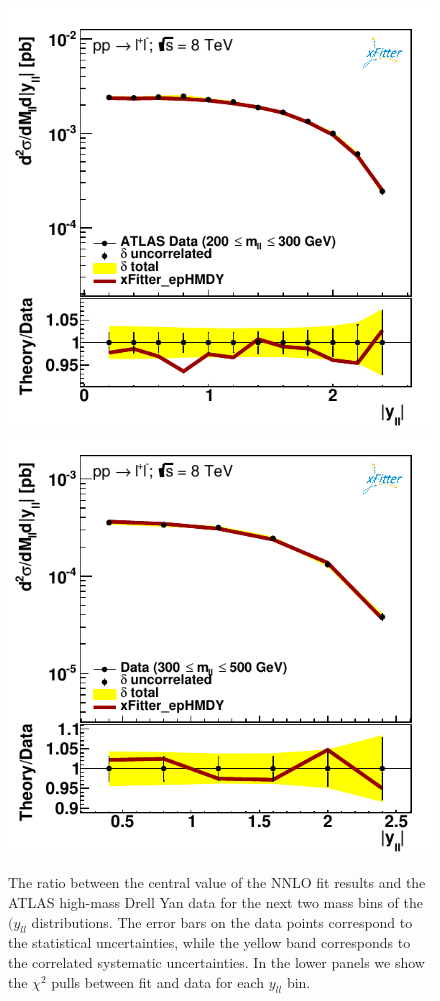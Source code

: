 \begin{figure}[t]
\centering
\includegraphics[width=16cm]{figs/data_403-1.pdf}\\
\includegraphics[width=16cm]{figs/data_404-1.pdf}
\caption{The ratio between the central value of the NNLO fit results
  and the ATLAS high-mass Drell Yan data
  for the next two mass bins of the $(y_{ll}$ distributions.
  The error bars on the data points correspond to the statistical
  uncertainties, while the yellow band
  corresponds to the correlated systematic uncertainties.
  In the lower panels we show the $\chi^2$ pulls between fit and data for each $y_{ll}$
  bin.
}
\label{hmDY_2D_2}
\end{figure}

